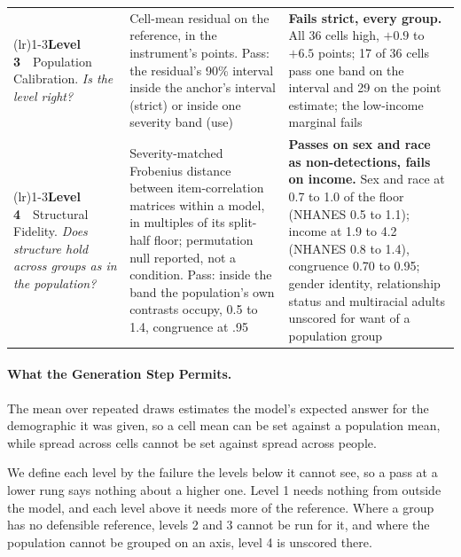 \documentclass[wcp]{jmlr}
\begin{document}
\begin{table}[!t]
\begin{tabular}{@{}>{\raggedright\arraybackslash}p{30mm}>{\raggedright\arraybackslash}p{52mm}>{\raggedright\arraybackslash}p{63mm}@{}}
\addlinespace[2pt]\cmidrule(lr){1-3}\addlinespace[2pt]
\textbf{Level 3}\ \ Population Calibration. \emph{Is the level right?}
 & Cell-mean residual on the reference, in the instrument's points. Pass: the residual's 90\% interval inside the anchor's interval (strict) or inside one severity band (use)
 & \textbf{Fails strict, every group.} All 36 cells high, $+0.9$ to $+6.5$ points; 17 of 36 cells pass one band on the interval and 29 on the point estimate; the low-income marginal fails \\
\addlinespace[2pt]\cmidrule(lr){1-3}\addlinespace[2pt]
\textbf{Level 4}\ \ Structural Fidelity. \emph{Does structure hold across groups as in the population?}
 & Severity-matched Frobenius distance between item-correlation matrices within a model, in multiples of its split-half floor; permutation null reported, not a condition. Pass: inside the band the population's own contrasts occupy, 0.5 to 1.4, congruence at .95
 & \textbf{Passes on sex and race as non-detections, fails on income.} Sex and race at 0.7 to 1.0 of the floor (NHANES 0.5 to 1.1); income at 1.9 to 4.2 (NHANES 0.8 to 1.4), congruence 0.70 to 0.95; gender identity, relationship status and multiracial adults unscored for want of a population group \\
\bottomrule
\end{tabular}
\end{table}

\paragraph{What the Generation Step Permits.}
\label{sec:estimand}
The mean over repeated draws estimates the model's expected
answer for the demographic it was given, so a cell mean can be set against a population mean,
while spread across cells cannot be set against spread across people.

We define each level by
the failure the levels below it cannot see, so a pass at a lower rung says nothing about a
higher one. Level 1 needs nothing from outside the model, and each level above it needs more of the reference. Where a group has no defensible reference, levels 2 and 3 cannot be run for it, and where the population cannot be grouped on an axis, level 4 is unscored there.
\label{sec:ceilings}
\end{document}
